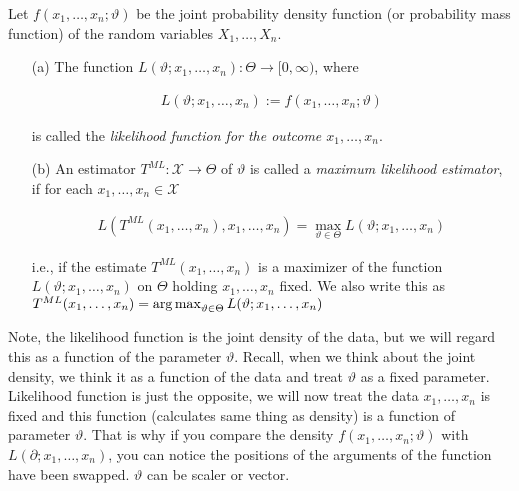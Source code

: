 \documentclass[ 11pt,%
				a4paper,%
				twoside,%
				headinclude,%
				footinclude = true,%
				cleardoublepage = empty,%
				reqno]{scrbook}
\begin{document}
\begin{definition}
  Let $f(x_1, \ldots, x_n ; \vartheta)$ be the joint probability density function (or probability mass function) of the random variables $X_{1}, \ldots, X_{n}$.    

\begin{itemize}
  \item[]
  \item[(a)] The function  $L(\vartheta ; x_{1}, \ldots, x_{n}): \Theta \rightarrow[0, \infty)$, where

    \begin{align*}
    L(\vartheta ; x_{1}, \ldots, x_{n}):=f(x_{1}, \ldots, x_{n} ; \vartheta)
  \end{align*} 

  is called the \emph{likelihood function for the outcome $x_{1}, \ldots, x_{n}$}. 

  \item[(b)] An estimator $T^{ML}: \mathcal{X} \rightarrow \Theta$ of $\vartheta$ is called a \emph{maximum likelihood estimator}, if for each $x_{1}, \ldots, x_{n} \in \mathcal{X}$

  \begin{align*}
  L( T^{ML}(x_{1}, \ldots, x_{n}), x_{1}, \ldots, x_{n})=\max _{\vartheta \in \Theta} L(\vartheta ; x_{1}, \ldots, x_{n})
  \end{align*}

i.e., if the estimate $T^{ML}(x_{1}, \ldots, x_{n})$ is a maximizer of the function $L(\vartheta ; x_{1}, \ldots, x_{n})$ on $\Theta$ holding $x_{1}, \ldots, x_{n}$ fixed. We also write this as ${T^{ML}(x_{1}, \ldots, x_{n}) = \operatorname*{arg\,max}_{\vartheta \in \Theta} L(\vartheta ; x_{1}, \ldots, x_{n})}$
\end{itemize}






\end{definition}


Note, the likelihood function is the joint density of the data, but we will regard this as a function of the parameter $\vartheta$. Recall, when we think about the joint density, we think it as a function of the data and treat $\vartheta$ as a fixed parameter. Likelihood function is just the opposite, we will now treat the data $x_{1}, \ldots, x_{n}$ is fixed and this function (calculates same thing as density) is a function of parameter $\vartheta$. That is why if you compare the density $f\left(x_{1}, \ldots, x_{n} ; \vartheta\right)$ with $L\left(\partial ; x_{1}, \ldots, x_{n}\right)$, you can notice the positions of the arguments of the function have been swapped. $\vartheta$ can be scaler or vector. 
\end{document}
